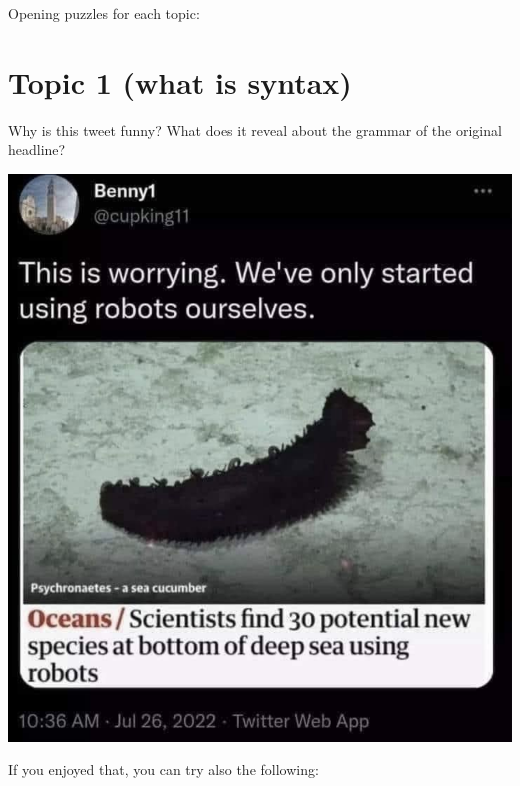 \documentclass{article}
\begin{document}
Opening puzzles for each topic:

\section{Topic 1 (what is syntax)}

Why is this tweet funny? What does it reveal about the grammar of the original headline?

\begin{center}
\includegraphics[width=0.6\linewidth, alt={Screenshot of a Tweet. A user posted a story with a photo of a sea cucumber and the headline: ``Oceans: Scientists find 30 potential new species at bottom of deep sea using robots''. The tweet reads: ``This is worrying. We've only started using robots ourselves.''}]{Images/deep-sea-robots.png}
\end{center}

If you enjoyed that, you can try also the following:
\end{document}

